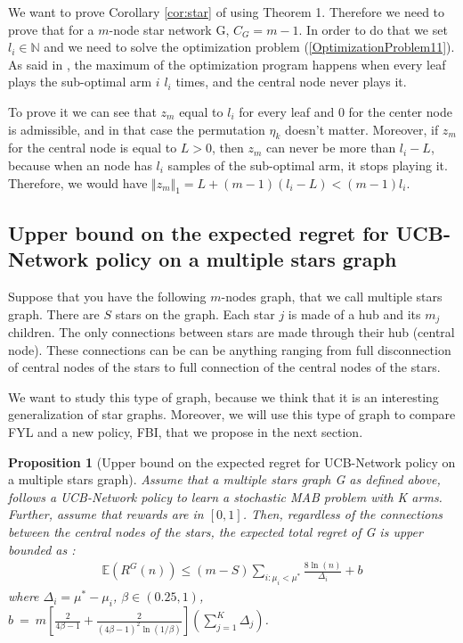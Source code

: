 \documentclass{article}
\newtheorem{proposition}{Proposition}
\begin{document}
We want to prove Corollary \ref{cor:star} of \cite{DBLP:journals/corr/KollaJG16} using Theorem 1. Therefore we need to prove that for a $m$-node star network G, $C_G = m-1$. In order to do that we set $l_i \in \mathbb{N}$ and we need to solve the optimization problem (\ref{OptimizationProblem11}). As said in \cite{DBLP:journals/corr/KollaJG16}, the maximum of the optimization program happens when every leaf plays the sub-optimal arm $i$ $l_i$ times, and the central node never plays it.

To prove it we can see that $z_m$ equal to $l_i$ for every leaf and 0 for the center node is admissible, and in that case the permutation $\eta_k$ doesn't matter. Moreover, if $z_m$ for the central node is equal to $L > 0$, then $z_m$ can never be more than $l_i - L$, because when an node has $l_i$ samples of the sub-optimal arm, it stops playing it. Therefore, we would have $\Vert z_m \Vert_1 = L + (m-1)(l_i -L) < (m-1)l_i$.

\subsection{Upper bound on the expected regret for UCB-Network policy on a multiple stars graph}

Suppose that you have the following $m$-nodes graph, that we call multiple stars graph. There are $S$ stars on the graph. Each star $j$ is made of a hub and its $m_j$ children. The only connections between stars are made through their hub (central node). These connections can be can be anything ranging from full disconnection of central nodes of the stars to full connection of the central nodes of the stars.

We want to study this type of graph, because we think that it is an interesting generalization of star graphs. Moreover, we will use this type of graph to compare FYL and a new policy, FBI, that we propose in the next section.

\begin{proposition}[Upper bound on the expected regret for UCB-Network policy on a multiple stars graph]
  Assume that  a multiple stars graph G as defined above, follows a UCB-Network policy to learn a stochastic MAB problem with K arms. Further, assume that rewards are in $[0, 1]$. Then, regardless of the connections between the central nodes of the stars, the expected total regret of G is upper bounded as :
  \begin{align*}
    \mathbb{E}(R^G(n)) \leq \left( m - S \right) \sum_{i:\mu_i< \mu^*} \frac{8\ln(n)}{\Delta_i}  + b
  \end{align*}
  where $\Delta_i = \mu^* - \mu_i$, $\beta \in (0.25,1)$, $b~=~m \left[ \frac{2}{4\beta -1} + \frac{2}{(4\beta-1)^2 \ln(1/\beta)} \right] \left( \sum\limits_{j=1}^K \Delta_j \right)$.
\end{proposition}
\end{document}
